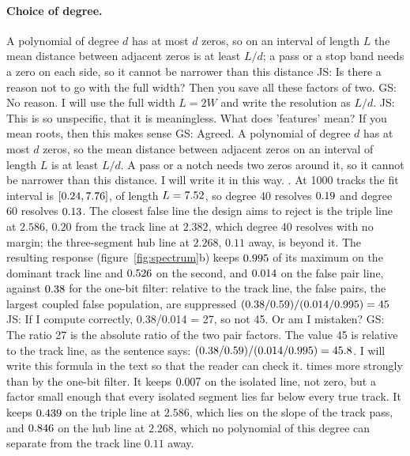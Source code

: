 \documentclass[11pt,a4paper]{article}
\newcommand{\js}[1]{{\color{blue} JS: #1 }}
\newcommand{\gs}[1]{{\color{orange!85!black} GS: #1 }}
\begin{document}
\paragraph{Choice of degree.}
A polynomial of degree $d$ has at most $d$ zeros, so on an interval of length $L$ the mean distance
between adjacent zeros is at least $L/d$; a pass or a stop band needs a zero on each side, so it cannot
be narrower than this distance \js{Is there a reason not to go with the full width? Then you save all these factors of two.} \gs{No reason. I will use the full width $L=2W$ and write the resolution as $L/d$.  } \js{This is so unspecific, that it is meaningless. What does 'features' mean? If you mean roots, then this makes sense} \gs{Agreed. A polynomial of degree $d$ has at most $d$ zeros, so the mean distance between adjacent zeros on an interval of length $L$ is at least $L/d$. A pass or a notch needs two zeros around it, so it cannot be narrower than this distance. I will write it in this way.  }. At 1000 tracks the fit interval is $[0.24,7.76]$, of length $L=7.52$, so
degree 40 resolves $0.19$ and degree 60 resolves $0.13$. The closest false line the design aims to reject is the triple line at $2.586$, $0.20$ from the
track line at $2.382$, which degree 40 resolves with no margin; the three-segment hub line at $2.268$, $0.11$ away,
is beyond it. The resulting response (figure~\ref{fig:spectrum}b) keeps
$0.995$ of its maximum on the dominant track line and $0.526$ on the second, and
$0.014$ on the false pair line, against $0.38$ for the one-bit filter: relative to the
track line, the false pairs, the largest coupled false population, are suppressed
$(0.38/0.59)/(0.014/0.995)=45$ \js{If I compute correctly, 0.38/0.014 = 27, so not 45. Or am I mistaken?} \gs{The ratio 27 is the absolute ratio of the two pair factors. The value 45 is relative to the track line, as the sentence says: $(0.38/0.59)/(0.014/0.995)=45.8$. I will write this formula in the text so that the reader can check it.  } times more strongly than by the one-bit filter. It keeps $0.007$ on the isolated line, not zero, but a factor small enough that every
isolated segment lies far below every true track. It keeps $0.439$ on the triple line at $2.586$,
which lies on the slope of the track pass, and $0.846$ on the hub line at $2.268$, which no
polynomial of this degree can separate from the track line $0.11$ away.
\end{document}
